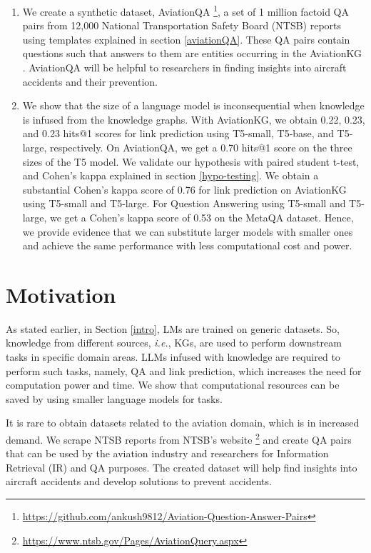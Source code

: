 \documentclass[11pt]{article}
\begin{document}
\begin{enumerate}

    \item We create a synthetic dataset, AviationQA \footnote{\url{https://github.com/ankush9812/Aviation-Question-Answer-Pairs}}, a set of 1 million factoid QA pairs from 12,000 National Transportation Safety Board (NTSB) reports using templates explained in section \ref{aviationQA}. These QA pairs contain questions such that answers to them are entities occurring in the AviationKG \cite{agarwal2022knowledge}. AviationQA will be helpful to researchers in finding insights into aircraft accidents and their prevention.


    \item We show that the size of a language model is inconsequential when knowledge is infused from the knowledge graphs. With AviationKG, we obtain 0.22, 0.23, and 0.23 hits@1 scores for link prediction using T5-small, T5-base, and T5-large, respectively. On AviationQA, we get a 0.70 hits@1 score on the three sizes of the T5 model. We validate our hypothesis with paired student t-test, and Cohen's kappa explained in section \ref{hypo-testing}. We obtain a substantial Cohen's kappa score of 0.76 for link prediction on AviationKG using T5-small and T5-large. For Question Answering using T5-small and T5-large, we get a Cohen's kappa score of 0.53 on the MetaQA dataset.   
    Hence, we provide evidence that we can substitute larger models with smaller ones and achieve the same performance with less computational cost and power. 
    
\end{enumerate}





\section{Motivation}
As stated earlier, in Section \ref{intro}, LMs are trained on generic datasets. So, knowledge from different sources, \textit{i.e.}, KGs, are used to perform downstream tasks in specific domain areas. LLMs infused with knowledge are required to perform such tasks, namely, QA and link prediction, which increases the need for computation power and time. We show that computational resources can be saved by using smaller language models for tasks.
\par
It is rare to obtain datasets related to the aviation domain, which is in increased demand.
We scrape NTSB reports from NTSB's website \footnote{\url{https://www.ntsb.gov/Pages/AviationQuery.aspx}} and create QA pairs that can be used by the aviation industry and researchers for Information Retrieval (IR) and QA purposes. The created dataset will help find insights into aircraft accidents and develop solutions to prevent accidents.
\end{document}

